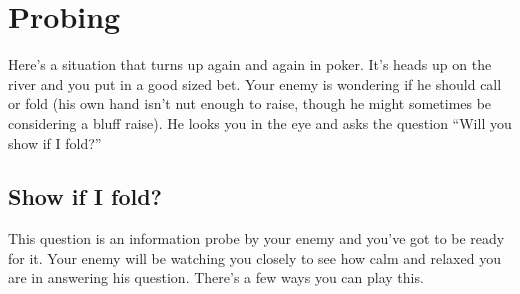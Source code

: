 \chapter{Probing}


Here's a situation that turns up again and again in poker.
It's heads up on the river and you put in a good sized bet.
Your enemy is wondering if he should call or fold (his own hand
isn't nut enough to raise, though he might sometimes be considering a
bluff raise). He looks you in the eye and asks the question ``Will you
show if I fold?''

\section{Show if I fold?}

This question is an information probe by your enemy and you've got
to be ready for it. Your enemy will be watching you closely
to see how calm and relaxed you are in answering his question.
There's a few ways you can play this.

